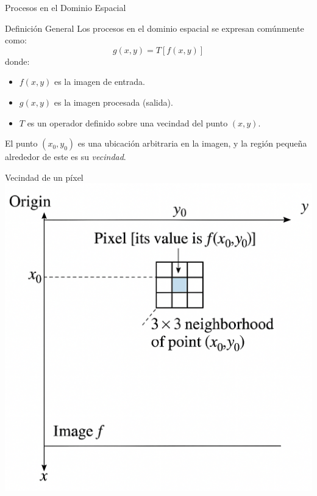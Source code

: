 \documentclass{beamer}
\begin{document}
\begin{frame}{Procesos en el Dominio Espacial}
    \begin{block}{Definición General}
    Los procesos en el dominio espacial se expresan comúnmente como:
    \begin{equation}\label{eq:general_transform_final}
        g(x, y) = T[f(x, y)]
    \end{equation}
    donde:
    \begin{itemize}
        \item $f(x, y)$ es la imagen de entrada.
        \item $g(x, y)$ es la imagen procesada (salida).
        \item $T$ es un operador definido sobre una vecindad del punto $(x, y)$.
    \end{itemize}
    El punto $(x_0, y_0)$ es una ubicación arbitraria en la imagen, y la región pequeña alrededor de este es su \textit{vecindad}.
    \end{block}
\end{frame}

\begin{frame}{Vecindad de un píxel}
    \centering %
    \includegraphics[width=0.7\linewidth]{figuras/Fig_3_1.png}
\end{frame}
\end{document}
